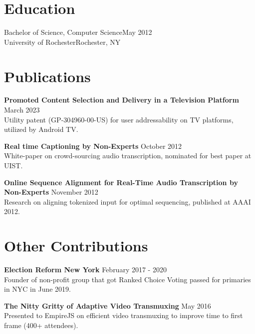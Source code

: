 \section{Education}

  Bachelor of Science, Computer Science\hfill May 2012\\
  University of Rochester\hfill Rochester, NY\\

\section{Publications}

  \begin{flushleft}

    \textbf{Promoted Content Selection and Delivery in a Television Platform} \hfill March  2023\\
    Utility patent (GP-304960-00-US) for user addressability on TV platforms, utilized by Android TV.
    \vspace{10pt}    
   

    \textbf{Real time Captioning by Non-Experts} \hfill October  2012\\
    White-paper on crowd-sourcing audio transcription, nominated for best paper at UIST.
    \vspace{10pt}    
    
    
    \textbf{Online Sequence Alignment for Real-Time Audio Transcription by Non-Experts} \hfill November 2012\\
    Research on aligning tokenized input for optimal sequencing, published at AAAI 2012.

  \end{flushleft}


\section{Other Contributions}
  \begin{flushleft}

    \textbf{Election Reform New York} \hfill February  2017 - 2020\\
    Founder of non-profit group that got Ranked Choice Voting passed for primaries in NYC in June 2019. 
    \vspace{10pt}    

        
    \textbf{The Nitty Gritty of Adaptive Video Transmuxing} \hfill May  2016\\
    Presented to EmpireJS on efficient video transmuxing to improve time to first frame (400+ attendees).
  \end{flushleft}

